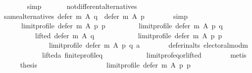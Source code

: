 \begin{isabellebody}
\ \ \ \ \ \ \isamarkupfalse%
\ simp\ \isanewline
\ \ \ \ \isamarkupfalse%
\ not{\isacharunderscore}{\kern0pt}different{\isacharunderscore}{\kern0pt}alternatives\isanewline
\ \ \ \ \isamarkupfalse%
\ same{\isacharunderscore}{\kern0pt}alternatives{\isacharcolon}{\kern0pt}\ {\isachardoublequoteopen}defer\ m\ A\ q\ {\isacharequal}{\kern0pt}\ defer\ m\ A\ p{\isachardoublequoteclose}\isanewline
\ \ \ \ \ \ \isamarkupfalse%
\ simp\isanewline
\ \ \ \ \isamarkupfalse%
\isanewline
\ \ \ \ \ \ {\isachardoublequoteopen}{\isacharparenleft}{\kern0pt}limit{\isacharunderscore}{\kern0pt}profile\ {\isacharparenleft}{\kern0pt}defer\ m\ A\ p{\isacharparenright}{\kern0pt}\ p{\isacharparenright}{\kern0pt}\ {\isacharequal}{\kern0pt}\isanewline
\ \ \ \ \ \ \ \ {\isacharparenleft}{\kern0pt}limit{\isacharunderscore}{\kern0pt}profile\ {\isacharparenleft}{\kern0pt}defer\ m\ A\ p{\isacharparenright}{\kern0pt}\ q{\isacharparenright}{\kern0pt}\ {\isasymor}\isanewline
\ \ \ \ \ \ \ \ \ \ lifted\ {\isacharparenleft}{\kern0pt}defer\ m\ A\ q{\isacharparenright}{\kern0pt}\isanewline
\ \ \ \ \ \ \ \ \ \ \ \ {\isacharparenleft}{\kern0pt}limit{\isacharunderscore}{\kern0pt}profile\ {\isacharparenleft}{\kern0pt}defer\ m\ A\ p{\isacharparenright}{\kern0pt}\ p{\isacharparenright}{\kern0pt}\isanewline
\ \ \ \ \ \ \ \ \ \ \ \ \ \ {\isacharparenleft}{\kern0pt}limit{\isacharunderscore}{\kern0pt}profile\ {\isacharparenleft}{\kern0pt}defer\ m\ A\ p{\isacharparenright}{\kern0pt}\ q{\isacharparenright}{\kern0pt}\ a{\isachardoublequoteclose}\isanewline
\ \ \ \ \ \ \isamarkupfalse%
\ defer{\isacharunderscore}{\kern0pt}in{\isacharunderscore}{\kern0pt}alts\ electoral{\isacharunderscore}{\kern0pt}mod{\isacharunderscore}{\kern0pt}m\isanewline
\ \ \ \ \ \ \ \ \ \ \ \ lifted{\isacharunderscore}{\kern0pt}a\ finite{\isacharunderscore}{\kern0pt}profile{\isacharunderscore}{\kern0pt}q\isanewline
\ \ \ \ \ \ \ \ \ \ \ \ limit{\isacharunderscore}{\kern0pt}prof{\isacharunderscore}{\kern0pt}eq{\isacharunderscore}{\kern0pt}or{\isacharunderscore}{\kern0pt}lifted\isanewline
\ \ \ \ \ \ \isamarkupfalse%
\ metis\isanewline
\ \ \ \ \isamarkupfalse%
\ {\isacharquery}{\kern0pt}thesis\isanewline
\ \ \ \ \isamarkupfalse%
\isanewline
\ \ \ \ \ \ \isamarkupfalse%
\isanewline
\ \ \ \ \ \ \ \ {\isachardoublequoteopen}limit{\isacharunderscore}{\kern0pt}profile\ {\isacharparenleft}{\kern0pt}defer\ m\ A\ p{\isacharparenright}{\kern0pt}\ p\ {\isacharequal}{\kern0pt}\isanewline

\end{isabellebody}
